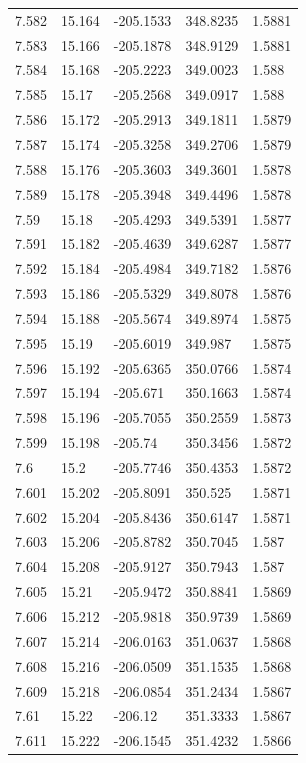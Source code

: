 \begin{tabular}{lllll}
7.582 & 15.164 & -205.1533 & 348.8235 & 1.5881 \\
7.583 & 15.166 & -205.1878 & 348.9129 & 1.5881 \\
7.584 & 15.168 & -205.2223 & 349.0023 & 1.588 \\
7.585 & 15.17 & -205.2568 & 349.0917 & 1.588 \\
7.586 & 15.172 & -205.2913 & 349.1811 & 1.5879 \\
7.587 & 15.174 & -205.3258 & 349.2706 & 1.5879 \\
7.588 & 15.176 & -205.3603 & 349.3601 & 1.5878 \\
7.589 & 15.178 & -205.3948 & 349.4496 & 1.5878 \\
7.59 & 15.18 & -205.4293 & 349.5391 & 1.5877 \\
7.591 & 15.182 & -205.4639 & 349.6287 & 1.5877 \\
7.592 & 15.184 & -205.4984 & 349.7182 & 1.5876 \\
7.593 & 15.186 & -205.5329 & 349.8078 & 1.5876 \\
7.594 & 15.188 & -205.5674 & 349.8974 & 1.5875 \\
7.595 & 15.19 & -205.6019 & 349.987 & 1.5875 \\
7.596 & 15.192 & -205.6365 & 350.0766 & 1.5874 \\
7.597 & 15.194 & -205.671 & 350.1663 & 1.5874 \\
7.598 & 15.196 & -205.7055 & 350.2559 & 1.5873 \\
7.599 & 15.198 & -205.74 & 350.3456 & 1.5872 \\
7.6 & 15.2 & -205.7746 & 350.4353 & 1.5872 \\
7.601 & 15.202 & -205.8091 & 350.525 & 1.5871 \\
7.602 & 15.204 & -205.8436 & 350.6147 & 1.5871 \\
7.603 & 15.206 & -205.8782 & 350.7045 & 1.587 \\
7.604 & 15.208 & -205.9127 & 350.7943 & 1.587 \\
7.605 & 15.21 & -205.9472 & 350.8841 & 1.5869 \\
7.606 & 15.212 & -205.9818 & 350.9739 & 1.5869 \\
7.607 & 15.214 & -206.0163 & 351.0637 & 1.5868 \\
7.608 & 15.216 & -206.0509 & 351.1535 & 1.5868 \\
7.609 & 15.218 & -206.0854 & 351.2434 & 1.5867 \\
7.61 & 15.22 & -206.12 & 351.3333 & 1.5867 \\
7.611 & 15.222 & -206.1545 & 351.4232 & 1.5866 \\

\end{tabular}
